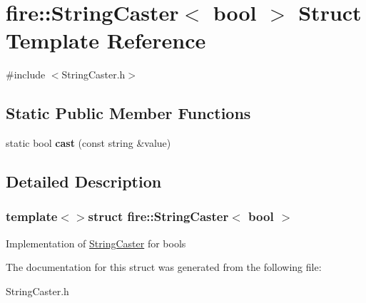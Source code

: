 \hypertarget{a00041}{}\section{fire\+:\+:String\+Caster$<$ bool $>$ Struct Template Reference}
\label{a00041}


{\ttfamily \#include $<$String\+Caster.\+h$>$}

\subsection*{Static Public Member Functions}
\begin{DoxyCompactItemize}
\item 
\hypertarget{a00041_a852e5b28ba000a44312d3ebcb3703e48}{}static bool {\bfseries cast} (const string \&value)\label{a00041_a852e5b28ba000a44312d3ebcb3703e48}

\end{DoxyCompactItemize}


\subsection{Detailed Description}
\subsubsection*{template$<$$>$struct fire\+::\+String\+Caster$<$ bool $>$}

Implementation of \hyperlink{a00040}{String\+Caster} for bools 

The documentation for this struct was generated from the following file\+:\begin{DoxyCompactItemize}
\item 
String\+Caster.\+h\end{DoxyCompactItemize}
